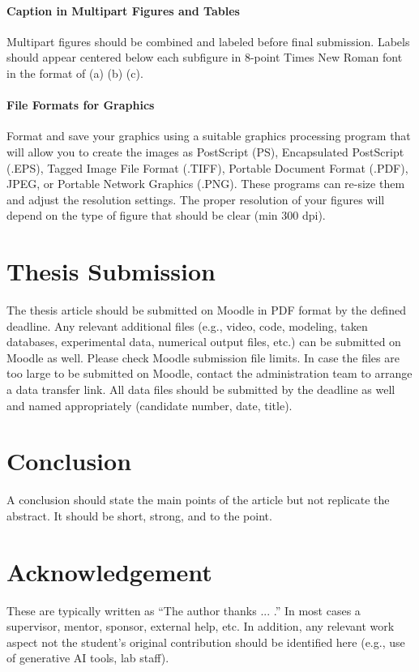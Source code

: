 \documentclass[11pt,a4paper]{article}
\begin{document}
\subsubsection{Caption in Multipart Figures and Tables}
Multipart figures should be combined and labeled before final submission. Labels should appear centered below each subfigure in 8-point Times New Roman font in the format of (a) (b) (c).

\subsubsection{File Formats for Graphics}
Format and save your graphics using a suitable graphics processing program that will allow you to create the images as PostScript (PS), Encapsulated PostScript (.EPS), Tagged Image File Format (.TIFF), Portable Document Format (.PDF), JPEG, or Portable Network Graphics (.PNG). These programs can re-size them and adjust the resolution settings. The proper resolution of your figures will depend on the type of figure that should be clear (min 300 dpi).

\chapter{Thesis Submission}
The thesis article should be submitted on Moodle in PDF format by the defined deadline. Any relevant additional files (e.g., video, code, modeling, taken databases, experimental data, numerical output files, etc.) can be submitted on Moodle as well. Please check Moodle submission file limits. In case the files are too large to be submitted on Moodle, contact the administration team to arrange a data transfer link. All data files should be submitted by the deadline as well and named appropriately (candidate number, date, title).

\chapter{Conclusion}
A conclusion should state the main points of the article but not replicate the abstract. It should be short, strong, and to the point.

\chapter{Acknowledgement}
These are typically written as “The author thanks ... .” In most cases a supervisor, mentor, sponsor, external help, etc. In addition, any relevant work aspect not the student's original contribution should be identified here (e.g., use of generative AI tools, lab staff).
\end{document}
